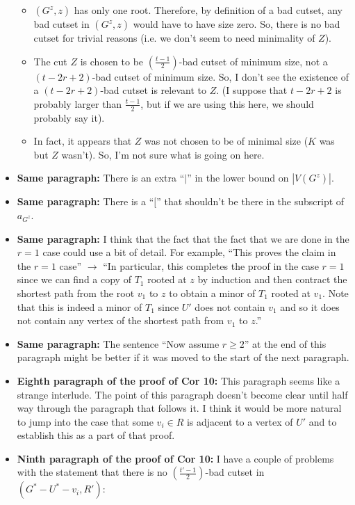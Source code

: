 \documentclass[11 pt]{article}
\begin{document}
\begin{itemize}
\begin{itemize}
\item $(G^z,z)$ has only one root. Therefore, by definition of a bad cutset, any bad cutset in $(G^z,z)$ would have to have size zero. So, there is no bad cutset for trivial reasons (i.e. we don't seem to need minimality of $Z$).
\item The cut $Z$ is chosen to be $\left(\frac{t-1}{2}\right)$-bad cutset of minimum size, not a $(t-2r+2)$-bad cutset of minimum size. So, I don't see the existence of a $(t-2r+2)$-bad cutset is relevant to $Z$. (I suppose that $t-2r+2$ is probably larger than $\frac{t-1}{2}$, but if we are using this here, we should probably say it). 
\item In fact, it appears that $Z$ was not chosen to be of minimal size ($K$ was but $Z$ wasn't). So, I'm not sure what is going on here. 
\end{itemize}
\item \textbf{Same paragraph:} There is an extra ``$|$'' in the lower bound on $|V(G^z)|$. 
\item \textbf{Same paragraph:} There is a ``$[$'' that shouldn't be there in the subscript of $a_{G^z}$. 
\item \textbf{Same paragraph:} I think that the fact that the fact that we are done in the $r=1$ case could use a bit of detail. For example, ``This proves the claim in the $r=1$ case'' $\to$ ``In particular, this completes the proof in the case $r=1$ since we can find a copy of $T_1$ rooted at $z$ by induction and then contract the shortest path from the root $v_1$ to $z$ to obtain a minor of $T_1$ rooted at $v_1$. Note that this is indeed a minor of $T_1$ since $U'$ does not contain $v_1$ and so it does not contain any vertex of the shortest path from $v_1$ to $z$.''
\item \textbf{Same paragraph:} The sentence ``Now assume $r\geq2$'' at the end of this paragraph might be better if it was moved to the start of the next paragraph. 
\item \textbf{Eighth paragraph of the proof of Cor 10:} This paragraph seems like a strange interlude. The point of this paragraph doesn't become clear until half way through the paragraph that follows it. I think it would be more natural to jump into the case that some $v_i\in R$ is adjacent to a vertex of $U'$ and to establish this as a part of that proof. 
\item[\color{red}{$\boldsymbol{(**)}$}] \textbf{Ninth paragraph of the proof of Cor 10:} I have a couple of problems with the statement that there is no $\left(\frac{t'-1}{2}\right)$-bad cutset in $(G^*-U^*-v_i,R')$:

\end{itemize}
\end{document}
